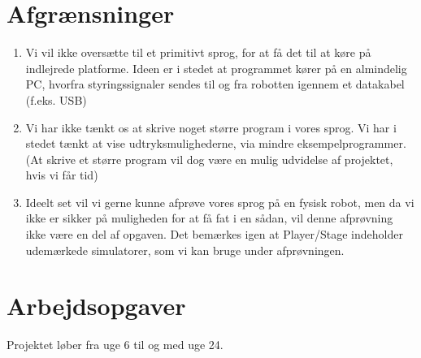 \documentclass[a4paper,oneside, draft]{memoir}
\begin{document}
\section{Afgrænsninger}
\begin{enumerate}

\item Vi vil ikke oversætte til et primitivt sprog, for at få det til at køre på
  indlejrede platforme. Ideen er i stedet at programmet kører på en almindelig
  PC, hvorfra styringssignaler sendes til og fra robotten igennem et datakabel
  (f.eks. USB)

%
\item Vi har ikke tænkt os at skrive noget større program i vores sprog. Vi har
  i stedet tænkt at vise udtryksmulighederne, via mindre eksempelprogrammer. (At
  skrive et større program vil dog være en mulig udvidelse af projektet, hvis vi
  får tid)

\item Ideelt set vil vi gerne kunne afprøve vores sprog på en fysisk robot, men
  da vi ikke er sikker på muligheden for at få fat i en sådan, vil denne
  afprøvning ikke være en del af opgaven. Det bemærkes igen at Player/Stage
  indeholder udemærkede simulatorer, som vi kan bruge under afprøvningen.

\end{enumerate}

\section{Arbejdsopgaver}

Projektet løber fra uge 6 til og med uge 24.
\end{document}
